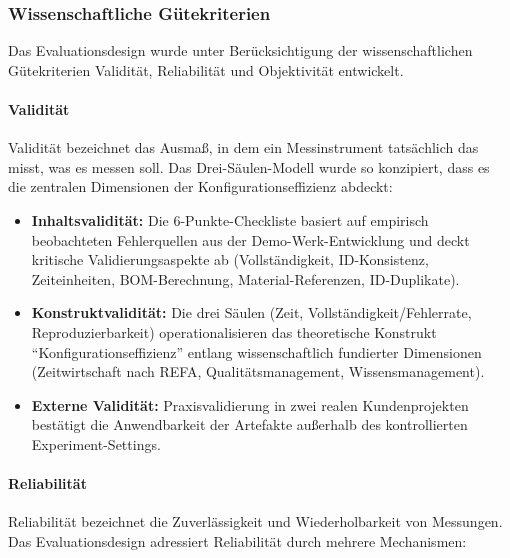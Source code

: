 \subsubsection{Wissenschaftliche Gütekriterien}
\label{subsubsec:Guetekriterien}

Das Evaluationsdesign wurde unter Berücksichtigung der wissenschaftlichen Gütekriterien Validität, Reliabilität und Objektivität entwickelt.

\paragraph{Validität}

Validität bezeichnet das Ausmaß, in dem ein Messinstrument tatsächlich das misst, was es messen soll. Das Drei-Säulen-Modell wurde so konzipiert, dass es die zentralen Dimensionen der Konfigurationseffizienz abdeckt:

\begin{itemize}
    \item \textbf{Inhaltsvalidität:} Die 6-Punkte-Checkliste basiert auf empirisch beobachteten Fehlerquellen aus der Demo-Werk-Entwicklung und deckt kritische Validierungsaspekte ab (Vollständigkeit, ID-Konsistenz, Zeiteinheiten, BOM-Berechnung, Material-Referenzen, ID-Duplikate).

    \item \textbf{Konstruktvalidität:} Die drei Säulen (Zeit, Vollständigkeit/Fehlerrate, Reproduzierbarkeit) operationalisieren das theoretische Konstrukt ``Konfigurationseffizienz'' entlang wissenschaftlich fundierter Dimensionen (Zeitwirtschaft nach REFA, Qualitätsmanagement, Wissensmanagement).

    \item \textbf{Externe Validität:} Praxisvalidierung in zwei realen Kundenprojekten bestätigt die Anwendbarkeit der Artefakte außerhalb des kontrollierten Experiment-Settings.
\end{itemize}

\paragraph{Reliabilität}

Reliabilität bezeichnet die Zuverlässigkeit und Wiederholbarkeit von Messungen. Das Evaluationsdesign adressiert Reliabilität durch mehrere Mechanismen:

